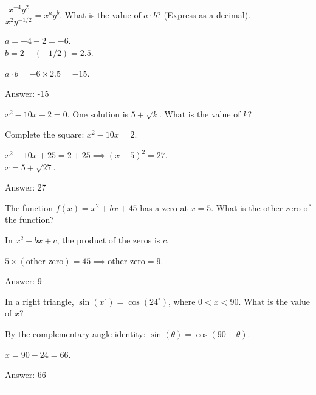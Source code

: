 \documentclass[11pt,paper=a4,answers]{exam}
\begin{document}
\begin{questions}
\question
$\dfrac{x^{-4}y^2}{x^2y^{-1/2}} = x^ay^b$. What is the value of $a \cdot b$? (Express as a decimal).

\begin{solution}
$a = -4 - 2 = -6$. \\
$b = 2 - (-1/2) = 2.5$.
\vspace{5pt}
\begin{center}
$a \cdot b = -6 \times 2.5 = -15$.
\end{center}
\vspace{5pt}
Answer: \colorbox{yellow!100}{-15}
\end{solution}

\vspace{1cm}

\question
$x^2 - 10x - 2 = 0$. One solution is $5 + \sqrt{k}$. What is the value of $k$?

\begin{solution}
Complete the square: $x^2 - 10x = 2$.
\vspace{5pt}
\begin{center}
$x^2 - 10x + 25 = 2 + 25 \implies (x - 5)^2 = 27$. \\
$x = 5 + \sqrt{27}$.
\end{center}
\vspace{5pt}
Answer: \colorbox{yellow!100}{27}
\end{solution}

\vspace{1cm}

\question
The function $f(x) = x^2 + bx + 45$ has a zero at $x = 5$. What is the other zero of the function?

\begin{solution}
In $x^2 + bx + c$, the product of the zeros is $c$.
\vspace{5pt}
\begin{center}
$5 \times (\text{other zero}) = 45 \implies \text{other zero} = 9$.
\end{center}
\vspace{5pt}
Answer: \colorbox{yellow!100}{9}
\end{solution}

\vspace{1cm}

\question
In a right triangle, $\sin(x^\circ) = \cos(24^\circ)$, where $0 < x < 90$. What is the value of $x$?

\begin{solution}
By the complementary angle identity: $\sin(\theta) = \cos(90 - \theta)$.
\vspace{5pt}
\begin{center}
$x = 90 - 24 = 66$.
\end{center}
\vspace{5pt}
Answer: \colorbox{yellow!100}{66}
\end{solution}


\end{questions}
\begin{center}
\rule{.5\textwidth}{1pt}
\end{center}
\end{document}
